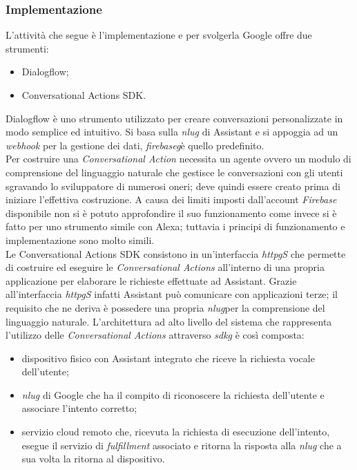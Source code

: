 		\subsubsection{Implementazione}
		L'attività che segue è l'implementazione e per svolgerla Google offre due strumenti:
		\begin{itemize}
			\item Dialogflow;
			\item Conversational Actions SDK.
		\end{itemize}
		Dialogflow è uno strumento utilizzato per creare conversazioni personalizzate in modo semplice ed intuitivo. Si basa sulla \emph{\gls{nlug}} di Assistant e si appoggia ad un \emph{webhook} per la gestione dei dati, \emph{\gls{firebaseg}}\glsfirstoccur è quello predefinito. \\
		Per costruire una \emph{Conversational Action} necessita un agente ovvero un modulo di comprensione del linguaggio naturale che gestisce le conversazioni con gli utenti sgravando lo sviluppatore di numerosi oneri; deve quindi essere creato prima di iniziare l'effettiva costruzione. A causa dei limiti imposti dall'account \emph{Firebase} disponibile non si è potuto approfondire il suo funzionamento come invece si è fatto per uno strumento simile con Alexa; tuttavia i principi di funzionamento e implementazione sono molto simili. \\
		Le Conversational Actions SDK consistono in un'interfaccia \emph{\gls{httpg}S} che permette di costruire ed eseguire le \emph{Conversational Actions} all'interno di una propria applicazione per elaborare le richieste effettuate ad Assistant. Grazie all'interfaccia \emph{\gls{httpg}S} infatti Assistant può comunicare con applicazioni terze; il requisito che ne deriva è possedere una propria \emph{\gls{nlug}}per la comprensione del linguaggio naturale. L'architettura ad alto livello del sistema che rappresenta l'utilizzo delle \emph{Conversational Actions} attraverso \emph{\gls{sdkg}} è così composta:
		\begin{itemize}
			\item dispositivo fisico con Assistant integrato che riceve la richiesta vocale dell'utente;
			\item \emph{\gls{nlug}} di Google che ha il compito di riconoscere la richiesta dell'utente e associare l'intento corretto;
			\item servizio cloud remoto che, ricevuta la richiesta di esecuzione dell'intento, esegue il servizio di \emph{fulfillment} associato e ritorna la risposta alla \emph{\gls{nlug}} che a sua volta la ritorna al dispositivo.
		\end{itemize}
